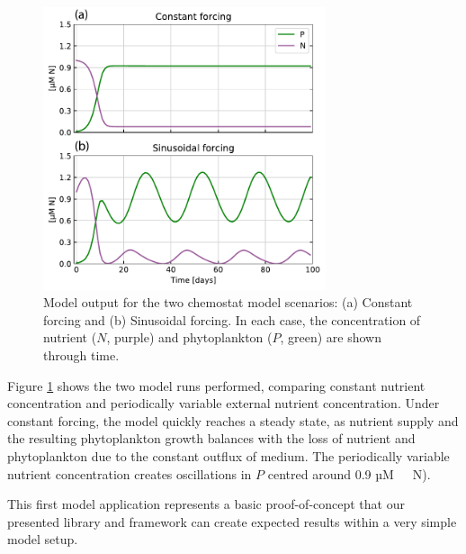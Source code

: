 \documentclass[journal abbreviation, manuscript]{copernicus}
\begin{document}
\begin{figure}[t]
\includegraphics[width=8.3cm]{Figures/firstdraft_plots/01_chemostat_output.pdf}
\caption{Model output for the two chemostat model scenarios: (a) Constant forcing and (b) Sinusoidal forcing. In each case, the concentration of nutrient ($N$, purple) and phytoplankton ($P$, green) are shown through time.}
\label{Figure:ResultsChemostat}
\end{figure}

Figure \ref{Figure:ResultsChemostat} shows the two model runs performed, comparing constant nutrient concentration and periodically variable external nutrient concentration. Under constant forcing, the model quickly reaches a steady state, as nutrient supply and the resulting phytoplankton growth balances with the loss of nutrient and phytoplankton due to the constant outflux of medium. The periodically variable nutrient concentration creates oscillations in $P$ centred around 0.9 \unit{µM \ N}).

This first model application represents a basic proof-of-concept that our presented library and framework can create expected results within a very simple model setup.
\end{document}

